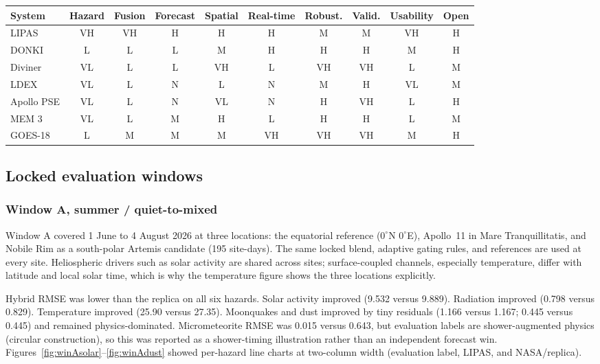 \begin{center}
\centering
\scriptsize
\setlength{\tabcolsep}{3.5pt}
\begin{tabular}{@{}lccccccccc@{}}
\toprule
System & Hazard & Fusion & Forecast & Spatial & Real-time & Robust. & Valid. & Usability & Open \\
\midrule
LIPAS & VH & VH & H & H & H & M & M & VH & H \\
DONKI & L & L & L & M & H & H & H & M & H \\
Diviner & VL & L & L & VH & L & VH & VH & L & M \\
LDEX & VL & L & N & L & N & M & H & VL & M \\
Apollo PSE & VL & L & N & VL & N & H & VH & L & H \\
MEM 3 & VL & L & M & H & L & H & H & L & M \\
GOES-18 & L & M & M & M & VH & VH & VH & M & H \\
\bottomrule
\end{tabular}
\label{tab:qual}
\end{center}

\begin{multicols}{2}
\subsection{Locked evaluation windows}

\subsubsection{Window A, summer / quiet-to-mixed}

Window A covered 1 June to 4 August 2026 at three locations: the equatorial reference ($0^\circ$N $0^\circ$E), Apollo~11 in Mare Tranquillitatis, and Nobile Rim as a south-polar Artemis candidate (195 site-days). The same locked blend, adaptive gating rules, and references are used at every site. Heliospheric drivers such as solar activity are shared across sites; surface-coupled channels, especially temperature, differ with latitude and local solar time, which is why the temperature figure shows the three locations explicitly.

Hybrid RMSE was lower than the replica on all six hazards. Solar activity improved (9.532 versus 9.889). Radiation improved (0.798 versus 0.829). Temperature improved (25.90 versus 27.35). Moonquakes and dust improved by tiny residuals (1.166 versus 1.167; 0.445 versus 0.445) and remained physics-dominated. Micrometeorite RMSE was 0.015 versus 0.643, but evaluation labels are shower-augmented physics (circular construction), so this was reported as a shower-timing illustration rather than an independent forecast win. Figures~\ref{fig:winAsolar}--\ref{fig:winAdust} showed per-hazard line charts at two-column width (evaluation label, LIPAS, and NASA/replica).
\end{multicols}

